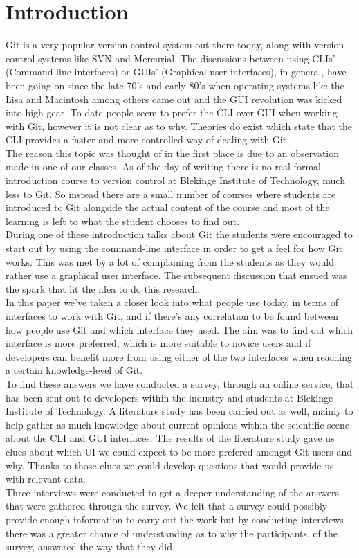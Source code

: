 \documentclass[a4paper,oneside]{bth} %
\begin{document}
		\chapter{Introduction}
		Git is a very popular version control system out there today, along with version control systems like SVN and Mercurial. The discussions between using CLIs' (Command-line interfaces) or GUIs' (Graphical user interfaces), in general, have been going on since the late 70's and early 80's when operating systems like the Lisa and Macintosh among others came out \cite{HistoryOfGUIWiki} and the GUI revolution was kicked into high gear.
		To date people seem to prefer the CLI over GUI when working with Git, however it is not clear as to why.
		Theories do exist which state that the CLI provides a faster and more controlled way of dealing with Git. \cite{GitUserSurvey}\cite{GitInClassroom}
		\\
		The reason this topic was thought of in the first place is due to an observation made in one of our classes. As of the day of writing there is no real formal introduction course to version control at Blekinge Institute of Technology, much less to Git. So instead there are a small number of courses where students are introduced to Git alongside the actual content of the course and most of the learning is left to what the student chooses to find out.\\
		During one of these introduction talks about Git the students were encouraged to start out by using the command-line interface in order to get a feel for how Git works. This was met by a lot of complaining from the students as they would rather use a graphical user interface. The subsequent discussion that ensued was the spark that lit the idea to do this research.
		\\
		In this paper we've taken a closer look into what people use today, in terms of interfaces to work with Git, and if there's any correlation to be found between how people use Git and which interface they used.
		The aim was to find out which interface is more preferred, which is more suitable to novice users and if developers can benefit more from using either of the two interfaces when reaching a certain knowledge-level of Git.\\
		To find these answers we have conducted a survey, through an online service, that has been sent out to developers within the industry and students at Blekinge Institute of Technology.
		A literature study has been carried out as well, mainly to help  gather as much knowledge about current opinions within the scientific scene about the CLI and GUI interfaces.
		The results of the literature study gave us clues about which UI we could expect to be more prefered amongst Git users and why. Thanks to those clues we could develop questions that would provide us with relevant data.\\
		Three interviews were conducted to get a deeper understanding of the answers that were gathered through the survey.
		We felt that a survey could possibly provide enough information to carry out the work but by conducting interviews there was a greater chance of understanding as to why the participants, of the survey, answered the way that they did.
		
\end{document}
